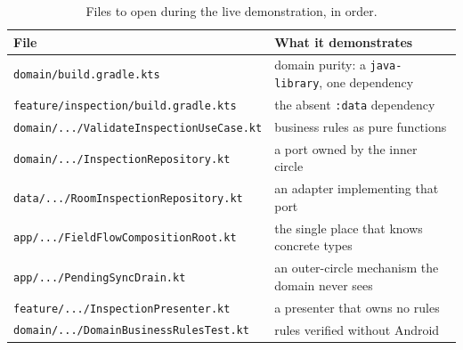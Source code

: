 \documentclass[11pt,a4paper]{article}
\newcommand{\mdl}[1]{\texttt{#1}}
\newcommand{\file}[1]{{\small\texttt{#1}}}
\begin{document}
\begin{table}[H]
\centering
\small
\begin{tabularx}{\linewidth}{@{}p{7.2cm} X@{}}
\toprule
\textbf{File} & \textbf{What it demonstrates} \\
\midrule
\file{domain/build.gradle.kts}                 & domain purity: a \texttt{java-library}, one dependency \\
\file{feature/inspection/build.gradle.kts}     & the absent \mdl{:data} dependency \\
\file{domain/.../ValidateInspectionUseCase.kt} & business rules as pure functions \\
\file{domain/.../InspectionRepository.kt}      & a port owned by the inner circle \\
\file{data/.../RoomInspectionRepository.kt}    & an adapter implementing that port \\
\file{app/.../FieldFlowCompositionRoot.kt}     & the single place that knows concrete types \\
\file{app/.../PendingSyncDrain.kt}             & an outer-circle mechanism the domain never sees \\
\file{feature/.../InspectionPresenter.kt}      & a presenter that owns no rules \\
\file{domain/.../DomainBusinessRulesTest.kt} & rules verified without Android \\
\bottomrule
\end{tabularx}
\caption{Files to open during the live demonstration, in order.}
\end{table}
\end{document}

